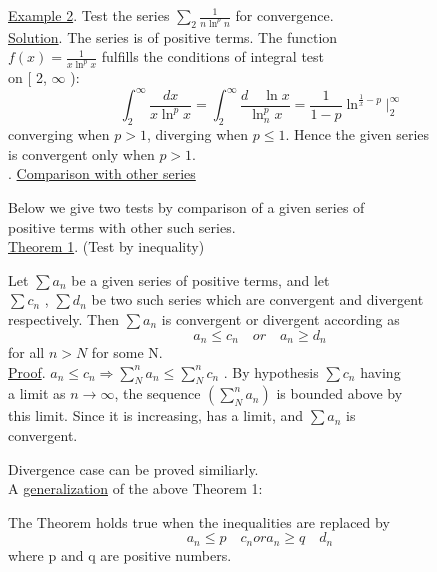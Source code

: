 \documentclass[11pt]{amsbook}
\begin{document}
 \underline{Example 2}. Test the series $\sum_2\frac{1}{n\ln^pn} $ for convergence.\\
\linebreak{}
\indent \underline{Solution}. The series is of positive terms. The function \\
 $f(x)=\frac{1}{x\ln^px} $ fulfills the conditions of integral test\\
on [ 2, $\infty $ ):
$${ \int_{2}^{\infty} \frac{dx}{x\ln^px}}={\int_{2}^{\infty}\frac{d\quad\ln x}{\ln^p_n x}}=\frac{1}{1-p}\ln^{\frac{1}{x}-p}\lvert  ^\infty_2$$
converging when $p>1$, diverging when $p\leq1$. Hence the given series \\
is convergent only when $p>1$.\\
\linebreak{}
. \underline{Comparison with other series}\newline
\setlength{\parindent}{1cm}\par
Below we give two tests by comparison of a given series of \\
positive terms with other such series.\\
\linebreak{}
\indent \underline{Theorem 1}. (Test by inequality)\\
\setlength{\parindent}{1cm}\par
\quad Let $\sum a_n$ be a given series of positive terms, and let\\
$\sum c_n$ , $\sum d_n$ be two such series which are convergent and divergent\\
respectively. Then $\sum a_n$ is convergent or divergent according as\\
$$a_n\leq c_n\quad or\quad a_n\geq d_n $$
for all $n>N$ for some N.\\
\linebreak{}
\quad \underline{Proof}. $a_n\leq c_n\Rightarrow \sum_N^n a_n \leq \sum_N^n c_n$ . By hypothesis $\sum c_n$ having\\
a limit as $n \rightarrow \infty $, the sequence $(\sum_N^n a_n)$ is bounded above by\\
this limit. Since it is increasing, has a limit, and $\sum a_n$ is\\
convergent.\\
\setlength{\parindent}{1cm}\par
Divergence case can be proved similiarly.\\
\indent A \underline{generalization} of the above Theorem 1:\\
\setlength{\parindent}{1cm}\par
The Theorem holds true when the inequalities are replaced by\\
$$a_n\leq p\quad c_n or a_n\geq q\quad d_n$$
where p and q are positive numbers.
\end{document}
